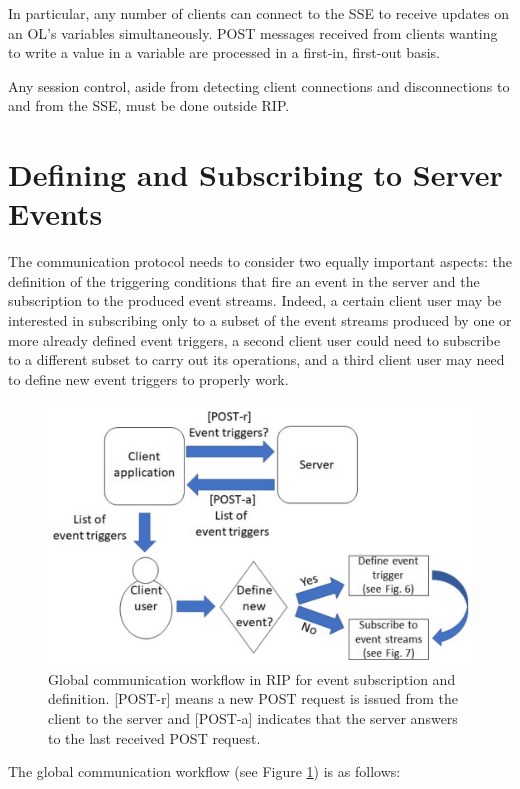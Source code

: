 In particular, any number of clients can connect to the SSE to receive updates on an OL's variables simultaneously. POST messages received from clients wanting to write a value in a variable are processed in a first-in, first-out basis.

Any session control, aside from detecting client connections and disconnections to and from the SSE, must be done outside RIP.

\section{Defining and Subscribing to Server Events}
The communication protocol needs to consider two equally important aspects: the definition of the triggering conditions that fire an event in the server and the subscription to the produced event streams. Indeed, a certain client user may be interested in subscribing only to a subset of the event streams produced by one or more already defined event triggers, a second client user could need to subscribe to a different subset to carry out its operations, and a third client user may need to define new event triggers to properly work.

\begin{figure}[b!]
\begin{center}
\centering
\includegraphics[width=0.8\columnwidth]{images/workflow_global.pdf}
\caption{Global communication workflow in RIP for event subscription and definition. [POST-r] means a new POST request is issued from the client to the server and [POST-a] indicates that the server answers to the last received POST request.}
\label{fig:global_workflow}
\end{center}
\end{figure}

The global communication workflow (see Figure \ref{fig:global_workflow}) is as follows:

